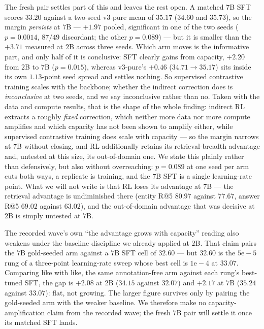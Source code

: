 The fresh pair settles part of this and leaves the rest open. A matched $7$B SFT scores $33.20$
against a two-seed v3-pure mean of $35.17$ ($34.60$ and $35.73$), so the margin \emph{persists} at
$7$B --- $+1.97$ pooled, significant in one of the two seeds ($p{=}0.0014$, $87/49$ discordant;
the other $p{=}0.089$) --- but it is smaller than the $+3.71$ measured at $2$B across three seeds.
Which arm moves is the informative part, and only half of it is conclusive: SFT clearly gains from
capacity, $+2.20$ from $2$B to $7$B ($p{=}0.015$), whereas v3-pure's $+0.46$ ($34.71 \to 35.17$)
sits inside its own $1.13$-point seed spread and settles nothing. So supervised contrastive
training scales with the backbone; whether the indirect correction does is \emph{inconclusive} at
two seeds, and we say inconclusive rather than no. Taken with the data and compute results, that is the shape of the whole
finding: indirect RL extracts a roughly \emph{fixed} correction, which neither more data nor
more compute amplifies and which capacity has not been shown to amplify either, while supervised
contrastive training does scale with capacity --- so the margin narrows at $7$B without closing,
and RL additionally retains its retrieval-breadth advantage and, untested at this size, its
out-of-domain one. We state this plainly rather than defensively, but also without
overreaching: $p{=}0.089$ at one seed per arm cuts both ways, a replicate is training, and the
$7$B SFT is a single learning-rate point. What we will not write is that RL loses its advantage
at $7$B --- the retrieval advantage is undiminished there (entity R@5 $80.97$ against $77.67$,
answer R@5 $69.02$ against $63.02$), and the out-of-domain advantage that was decisive at $2$B is
simply untested at $7$B.

The recorded wave's own ``the advantage grows with capacity'' reading also weakens under the
baseline discipline we already applied at $2$B. That claim pairs the $7$B gold-seeded arm against
a $7$B SFT cell of $32.60$ --- but $32.60$ is the $5\mathrm{e}{-}5$ rung of a three-point
learning-rate sweep whose best cell is $1\mathrm{e}{-}4$ at $33.07$. Comparing like with like,
the same annotation-free arm against each rung's best-tuned SFT, the gap is $+2.08$ at $2$B
($34.15$ against $32.07$) and $+2.17$ at $7$B ($35.24$ against $33.07$): flat, not growing. The
larger figure survives only by pairing the gold-seeded arm with the weaker baseline. We therefore
make no capacity-amplification claim from the recorded wave; the fresh $7$B pair will settle it
once its matched SFT lands.

